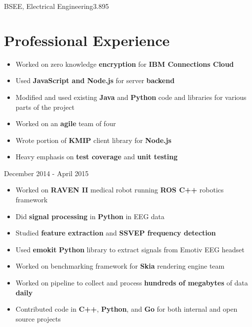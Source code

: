 \documentclass{my_resume}
\begin{document}

	{BSEE, Electrical Engineering}{3.895}

\section{Professional Experience}
\begin{itemize}
	\item Worked on zero knowledge \textbf{encryption} for 
		\textbf{IBM Connections Cloud}
	\item Used \textbf{JavaScript and Node.js} for server \textbf{backend}
	\item Modified and used existing \textbf{Java} and \textbf{Python} code
		and libraries for various parts of the project
	\item Worked on an \textbf{agile} team of four
	\item Wrote portion of \textbf{KMIP} client library for \textbf{Node.js}
    \item Heavy emphasis on \textbf{test coverage} and \textbf{unit testing}
\end{itemize}
	{December 2014 - April 2015}
\begin{itemize}
	\item Worked on \textbf{RAVEN II} medical robot running \textbf{ROS C++}
		robotics framework
	\item Did \textbf{signal processing} in \textbf{Python} in EEG data
	\item Studied \textbf{feature extraction} and \textbf{SSVEP frequency detection}
	\item Used \textbf{emokit} \textbf{Python} library to extract signals from
		Emotiv EEG headset
\end{itemize}
\begin{itemize}
	\item Worked on benchmarking framework for \textbf{Skia} rendering engine team
    \item Worked on pipeline to collect and process \textbf{hundreds of megabytes} of data \textbf{daily}
	\item Contributed code in \textbf{C++}, \textbf{Python}, and \textbf{Go} for
		both internal and open source projects
\end{itemize}
\end{document}
